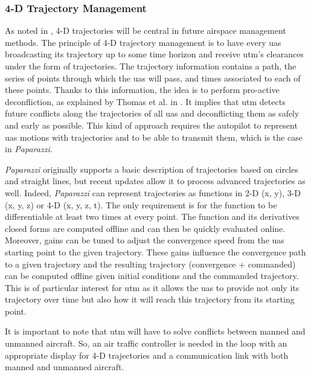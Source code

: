 	\subsubsection{4-D Trajectory Management}
		As noted in \cite{erzberger_4D_2002}, 4-D trajectories will be central in future airspace management methods. The principle of 4-D trajectory management is to have every \gls{uas} broadcasting its trajectory up to some time horizon and receive \gls{utm}'s clearances under the form of trajectories. 
		The trajectory information contains a path, the series of points through which the \gls{uas} will pass, and times associated to each of these points. 
		Thanks to this information, the idea is to perform pro-active deconfliction, as explained by Thomas et al. in \cite{thomas_4D_2015}. It implies that \gls{utm} detects future conflicts along the trajectories of all \gls{uas} and deconflicting them as safely and early as possible.
		This kind of approach requires the autopilot to represent \gls{uas} motions with trajectories and to be able to transmit them, which is the case in \emph{Paparazzi}.
		
		\emph{Paparazzi} originally supports a basic description of trajectories based on circles and straight lines, but recent updates allow it to process advanced trajectories as well. 
		Indeed, \emph{Paparazzi} can represent trajectories as functions in 2-D (x, y), 3-D (x, y, z) or 4-D (x, y, z, t). The only requirement is for the function to be differentiable at least two times at every point. The function and its derivatives closed forms are computed offline and can then be quickly evaluated online.
		Moreover, gains can be tuned to adjust the convergence speed from the \gls{uas} starting point to the given trajectory. These gains influence the convergence path to a given trajectory and the resulting trajectory (convergence + commanded) can be computed offline given initial conditions and the commanded trajectory.
		This is of particular interest for \gls{utm} as it allows the \gls{uas} to provide not only its trajectory over time but also how it will reach this trajectory from its starting point.	

		It is important to note that \gls{utm} will have to solve conflicts between manned and unmanned aircraft. So, an air traffic controller is needed in the loop with an appropriate display for 4-D trajectories and a communication link with both manned and unmanned aircraft.
		
